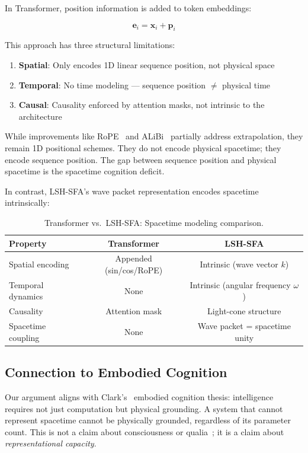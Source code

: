 \documentclass{article}
\begin{document}
In Transformer, position information is added to token embeddings:

\begin{equation}
\mathbf{e}_i = \mathbf{x}_i + \mathbf{p}_i
\end{equation}

This approach has three structural limitations:

\begin{enumerate}
\item \textbf{Spatial}: Only encodes 1D linear sequence position, not physical space
\item \textbf{Temporal}: No time modeling --- sequence position $\neq$ physical time
\item \textbf{Causal}: Causality enforced by attention masks, not intrinsic to the architecture
\end{enumerate}

While improvements like RoPE~\citep{su2024roformer} and ALiBi~\citep{press2022train} partially address extrapolation, they remain 1D positional schemes. They do not encode physical spacetime; they encode sequence position. The gap between sequence position and physical spacetime is the spacetime cognition deficit.

In contrast, LSH-SFA's wave packet representation encodes spacetime intrinsically:

\begin{table}[h]
\centering
\caption{Transformer vs.\ LSH-SFA: Spacetime modeling comparison.}
\label{tab:spacetime}
\begin{tabular}{lcc}
\toprule
\textbf{Property} & \textbf{Transformer} & \textbf{LSH-SFA} \\
\midrule
Spatial encoding & Appended (sin/cos/RoPE) & Intrinsic (wave vector $k$) \\
Temporal dynamics & None & Intrinsic (angular frequency $\omega$) \\
Causality & Attention mask & Light-cone structure \\
Spacetime coupling & None & Wave packet = spacetime unity \\
\end{tabular}
\end{table}

\subsection{Connection to Embodied Cognition}

Our argument aligns with Clark's~\citep{clark1997} embodied cognition thesis: intelligence requires not just computation but physical grounding. A system that cannot represent spacetime cannot be physically grounded, regardless of its parameter count. This is not a claim about consciousness or qualia~\citep{chalmers1996}; it is a claim about \textit{representational capacity}.
\end{document}
